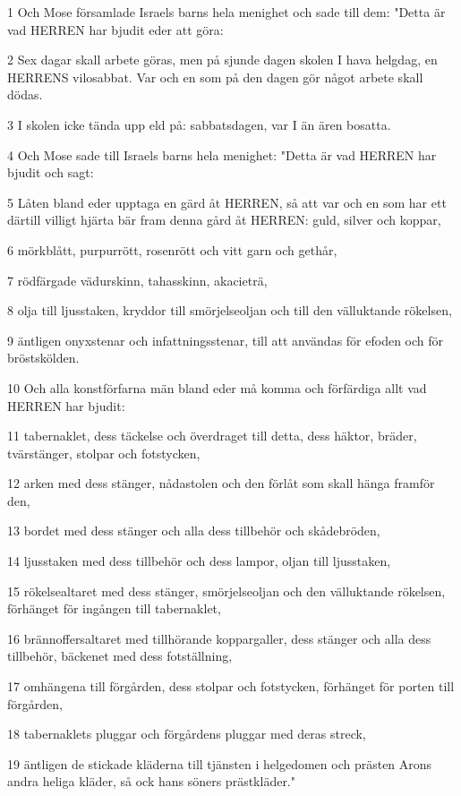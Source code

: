 \par 1 Och Mose församlade Israels barns hela menighet och sade till dem: "Detta är vad HERREN har bjudit eder att göra:
\par 2 Sex dagar skall arbete göras, men på sjunde dagen skolen I hava helgdag, en HERRENS vilosabbat. Var och en som på den dagen gör något arbete skall dödas.
\par 3 I skolen icke tända upp eld på: sabbatsdagen, var I än ären bosatta.
\par 4 Och Mose sade till Israels barns hela menighet: "Detta är vad HERREN har bjudit och sagt:
\par 5 Låten bland eder upptaga en gärd åt HERREN, så att var och en som har ett därtill villigt hjärta bär fram denna gård åt HERREN: guld, silver och koppar,
\par 6 mörkblått, purpurrött, rosenrött och vitt garn och gethår,
\par 7 rödfärgade vädurskinn, tahasskinn, akacieträ,
\par 8 olja till ljusstaken, kryddor till smörjelseoljan och till den välluktande rökelsen,
\par 9 äntligen onyxstenar och infattningsstenar, till att användas för efoden och för bröstskölden.
\par 10 Och alla konstförfarna män bland eder må komma och förfärdiga allt vad HERREN har bjudit:
\par 11 tabernaklet, dess täckelse och överdraget till detta, dess häktor, bräder, tvärstänger, stolpar och fotstycken,
\par 12 arken med dess stänger, nådastolen och den förlåt som skall hänga framför den,
\par 13 bordet med dess stänger och alla dess tillbehör och skådebröden,
\par 14 ljusstaken med dess tillbehör och dess lampor, oljan till ljusstaken,
\par 15 rökelsealtaret med dess stänger, smörjelseoljan och den välluktande rökelsen, förhänget för ingången till tabernaklet,
\par 16 brännoffersaltaret med tillhörande koppargaller, dess stänger och alla dess tillbehör, bäckenet med dess fotställning,
\par 17 omhängena till förgården, dess stolpar och fotstycken, förhänget för porten till förgården,
\par 18 tabernaklets pluggar och förgårdens pluggar med deras streck,
\par 19 äntligen de stickade kläderna till tjänsten i helgedomen och prästen Arons andra heliga kläder, så ock hans söners prästkläder."
